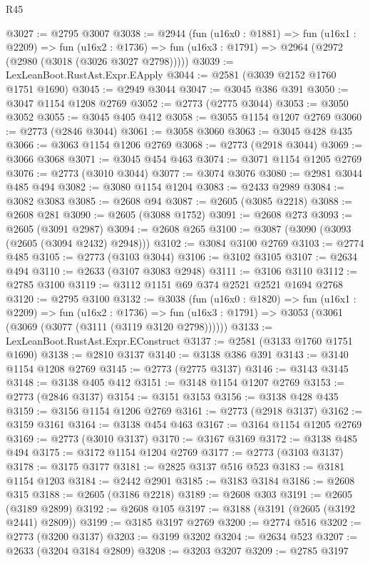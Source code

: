 \begin{lexlean}{R45}
\begin{coremodule}
@3027 := @2795 @3007
@3038 := @2944
    (fun (u16x0 : @1881) =>
    fun (u16x1 : @2209) =>
    fun (u16x2 : @1736) => fun (u16x3 : @1791) => @2964 (@2972 (@2980 (@3018 (@3026 @3027 @2798)))))
@3039 := LexLeanBoot.RustAst.Expr.EApply
@3044 := @2581 (@3039 @2152 @1760 @1751 @1690)
@3045 := @2949 @3044
@3047 := @3045 @386 @391
@3050 := @3047 @1154 @1208 @2769
@3052 := @2773 (@2775 @3044)
@3053 := @3050 @3052
@3055 := @3045 @405 @412
@3058 := @3055 @1154 @1207 @2769
@3060 := @2773 (@2846 @3044)
@3061 := @3058 @3060
@3063 := @3045 @428 @435
@3066 := @3063 @1154 @1206 @2769
@3068 := @2773 (@2918 @3044)
@3069 := @3066 @3068
@3071 := @3045 @454 @463
@3074 := @3071 @1154 @1205 @2769
@3076 := @2773 (@3010 @3044)
@3077 := @3074 @3076
@3080 := @2981 @3044 @485 @494
@3082 := @3080 @1154 @1204
@3083 := @2433 @2989
@3084 := @3082 @3083
@3085 := @2608 @94
@3087 := @2605 (@3085 @2218)
@3088 := @2608 @281
@3090 := @2605 (@3088 @1752)
@3091 := @2608 @273
@3093 := @2605 (@3091 @2987)
@3094 := @2608 @265
@3100 := @3087 (@3090 (@3093 (@2605 (@3094 @2432) @2948)))
@3102 := @3084 @3100 @2769
@3103 := @2774 @485
@3105 := @2773 (@3103 @3044)
@3106 := @3102 @3105
@3107 := @2634 @494
@3110 := @2633 (@3107 @3083 @2948)
@3111 := @3106 @3110
@3112 := @2785 @3100
@3119 := @3112 @1151 @69 @374 @2521 @2521 @1694 @2768
@3120 := @2795 @3100
@3132 := @3038
    (fun (u16x0 : @1820) =>
    fun (u16x1 : @2209) =>
    fun (u16x2 : @1736) =>
    fun (u16x3 : @1791) => @3053 (@3061 (@3069 (@3077 (@3111 (@3119 @3120 @2798))))))
@3133 := LexLeanBoot.RustAst.Expr.EConstruct
@3137 := @2581 (@3133 @1760 @1751 @1690)
@3138 := @2810 @3137
@3140 := @3138 @386 @391
@3143 := @3140 @1154 @1208 @2769
@3145 := @2773 (@2775 @3137)
@3146 := @3143 @3145
@3148 := @3138 @405 @412
@3151 := @3148 @1154 @1207 @2769
@3153 := @2773 (@2846 @3137)
@3154 := @3151 @3153
@3156 := @3138 @428 @435
@3159 := @3156 @1154 @1206 @2769
@3161 := @2773 (@2918 @3137)
@3162 := @3159 @3161
@3164 := @3138 @454 @463
@3167 := @3164 @1154 @1205 @2769
@3169 := @2773 (@3010 @3137)
@3170 := @3167 @3169
@3172 := @3138 @485 @494
@3175 := @3172 @1154 @1204 @2769
@3177 := @2773 (@3103 @3137)
@3178 := @3175 @3177
@3181 := @2825 @3137 @516 @523
@3183 := @3181 @1154 @1203
@3184 := @2442 @2901
@3185 := @3183 @3184
@3186 := @2608 @315
@3188 := @2605 (@3186 @2218)
@3189 := @2608 @303
@3191 := @2605 (@3189 @2899)
@3192 := @2608 @105
@3197 := @3188 (@3191 (@2605 (@3192 @2441) @2809))
@3199 := @3185 @3197 @2769
@3200 := @2774 @516
@3202 := @2773 (@3200 @3137)
@3203 := @3199 @3202
@3204 := @2634 @523
@3207 := @2633 (@3204 @3184 @2809)
@3208 := @3203 @3207
@3209 := @2785 @3197

\end{coremodule}
\end{lexlean}
